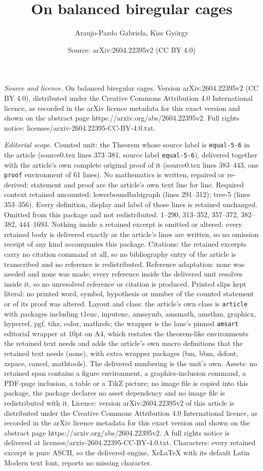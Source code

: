 \documentclass[10pt,a4paper]{amsart}
\title[On balanced biregular cages]{On balanced biregular cages}
\author{Araujo-Pardo Gabriela, Kiss Gy\"orgy}
\date{Source: arXiv:2604.22395v2 (CC BY 4.0)}
\begin{document}
\maketitle

\noindent\emph{Source and licence.} On balanced biregular cages. Version arXiv:2604.22395v2 (CC BY 4.0), distributed under the Creative Commons Attribution 4.0 International licence, as recorded in the arXiv licence metadata for this exact version and shown on the abstract page https://arxiv.org/abs/2604.22395v2. Full rights notice: licenses/arxiv-2604.22395-CC-BY-4.0.txt.\par\smallskip

\noindent\textit{Editorial scope.} Counted unit: the Theorem whose source label is \texttt{equal-5-6} in the article (source0.tex lines 373--381, source label \texttt{equal-5-6}), delivered together with the article's own complete original proof of it (source0.tex lines 383--443, one \texttt{proof} environment of 61 lines). No mathematics is written, repaired or re-derived: statement and proof are the article's own text line for line. Required context retained uncounted: lowerboundbabigraph (lines 291--312); tree-5 (lines 353--356). Every definition, display and label of those lines is retained unchanged. Omitted from this package and not redistributed: 1--290, 313--352, 357--372, 382--382, 444--1693. Nothing inside a retained excerpt is omitted or altered: every retained body is delivered exactly as the article's lines are written, so no omission receipt of any kind accompanies this package. Citations: the retained excerpts carry no citation command at all, so no bibliography entry of the article is transcribed and no reference is redistributed. Reference adaptation: none was needed and none was made; every reference inside the delivered unit resolves inside it, so no unresolved reference or citation is produced. Printed slips kept literal: no printed word, symbol, hypothesis or number of the counted statement or of its proof was altered. Layout and class: the article's own class is \texttt{article} with packages including t1enc, inputenc, amssymb, amsmath, amsthm, graphicx, hyperref, pgf, tikz, color, mathrsfs; the wrapper is the lane's pinned \texttt{amsart} editorial wrapper at 10pt on A4, which restates the theorem-like environments the retained text needs and adds the article's own macro definitions that the retained text needs (none), with extra wrapper packages (bm, bbm, dsfont, xspace, cancel, mathtools). The delivered numbering is the unit's own. Assets: no retained span contains a figure environment, a graphics-inclusion command, a PDF-page inclusion, a table or a TikZ picture; no image file is copied into this package, the package declares no asset dependency and no image file is redistributed with it. Licence: version arXiv:2604.22395v2 of this article is distributed under the Creative Commons Attribution 4.0 International licence, as recorded in the arXiv licence metadata for this exact version and shown on the abstract page https://arxiv.org/abs/2604.22395v2. A full rights notice is delivered at licenses/arxiv-2604.22395-CC-BY-4.0.txt. Characters: every retained excerpt is pure ASCII, so the delivered engine, XeLaTeX with its default Latin Modern text font, reports no missing character.
\end{document}
